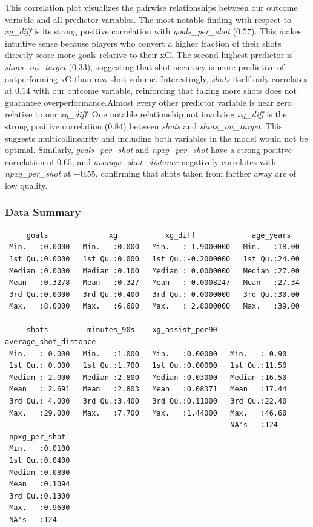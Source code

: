 \documentclass[
  letterpaper,
  DIV=11,
  numbers=noendperiod]{scrartcl}
\begin{document}
This correlation plot visualizes the pairwise relationships between our
outcome variable and all predictor variables. The most notable finding
with respect to \emph{xg\_diff} is its strong positive correlation with
\emph{goals\_per\_shot} (\(0.57\)). This makes intuitive sense because
players who convert a higher fraction of their shots directly score more
goals relative to their xG. The second highest predictor is
\emph{shots\_on\_target} (\(0.33\)), suggesting that shot accuracy is
more predictive of outperforming xG than raw shot volume. Interestingly,
\emph{shots} itself only correlates at \(0.14\) with our outcome
variable, reinforcing that taking more shots does not guarantee
overperformance.Almost every other predictor variable is near zero
relative to our \emph{xg\_diff}. One notable relationship not involving
\emph{xg\_diff} is the strong positive correlation (\(0.84\)) between
\emph{shots} and \emph{shots\_on\_target}. This suggests
multicollinearity and including both variables in the model would not be
optimal. Similarly, \emph{goals\_per\_shot} and \emph{npxg\_per\_shot}
have a strong positive correlation of \(0.65\), and
\emph{average\_shot\_distance} negatively correlates with
\emph{npxg\_per\_shot} at \(-0.55\), confirming that shots taken from
farther away are of low quality.

\subsubsection{Data Summary}\label{data-summary}

\begin{verbatim}
     goals              xg           xg_diff             age_years    
 Min.   :0.0000   Min.   :0.000   Min.   :-1.9000000   Min.   :18.00  
 1st Qu.:0.0000   1st Qu.:0.000   1st Qu.:-0.2000000   1st Qu.:24.00  
 Median :0.0000   Median :0.100   Median : 0.0000000   Median :27.00  
 Mean   :0.3278   Mean   :0.327   Mean   : 0.0008247   Mean   :27.34  
 3rd Qu.:0.0000   3rd Qu.:0.400   3rd Qu.: 0.0000000   3rd Qu.:30.00  
 Max.   :8.0000   Max.   :6.600   Max.   : 2.8000000   Max.   :39.00  
                                                                      
     shots         minutes_90s    xg_assist_per90   average_shot_distance
 Min.   : 0.000   Min.   :1.000   Min.   :0.00000   Min.   : 0.90        
 1st Qu.: 0.000   1st Qu.:1.700   1st Qu.:0.00000   1st Qu.:11.50        
 Median : 2.000   Median :2.800   Median :0.03000   Median :16.50        
 Mean   : 2.691   Mean   :2.803   Mean   :0.08371   Mean   :17.44        
 3rd Qu.: 4.000   3rd Qu.:3.400   3rd Qu.:0.11000   3rd Qu.:22.40        
 Max.   :29.000   Max.   :7.700   Max.   :1.44000   Max.   :46.60        
                                                    NA's   :124          
 npxg_per_shot   
 Min.   :0.0100  
 1st Qu.:0.0400  
 Median :0.0800  
 Mean   :0.1094  
 3rd Qu.:0.1300  
 Max.   :0.9600  
 NA's   :124     
\end{verbatim}
\end{document}
